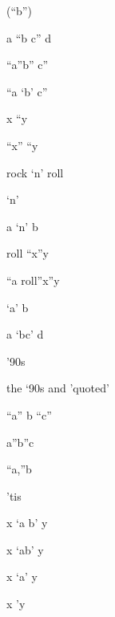 (``b'')

a ``b c'' d

``a''b'' c''

``a `b' c''

x ``y

``x'' ``y

rock `n' roll

`n'

a `n' b

roll ``x''y

``a roll''x''y

`a' b

a `bc' d

'90s

the `90s and 'quoted'

``a'' b ``c''

a''b''c

``a,''b

'tis

x `a b' y

x `ab' y

x `a' y

x 'y
